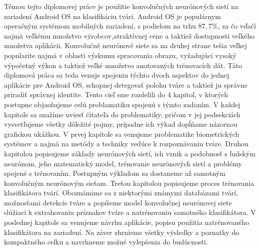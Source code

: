 \indent Témou tejto diplomovej práce je použitie konvolučných neurónových sietí na zariadení Android OS na klasifikáciu tvárí.
Android OS je populárnym operačným systémom mobilných zariadení, s podielom na trhu $ 87,7\% $, za čo vďačí najmä veľkému množstvo výrobcov,atraktívnej cene a taktiež dostupnosti veľkého množstva aplikácii.
Konvolučné neurónové siete sa na druhej strane tešia veľkej popularite najmä v oblasti výskumu spracovania obrazu, vyžadujúci vysoký výpočetný výkon a taktiež veľké množstvo anotovaných trénovacích dát.
Táto diplomová práca sa teda venuje spojeniu týchto dvoch aspektov do jednej aplikácie pre Android OS, schopnej detegovať polohu tváre a taktiež ju správne priradiť správnej identite.
Tento cieľ sme rozdelili do 4 kapitol, v ktorých postupne objasňujeme celú problamatiku spojenú s týmto zadaním.
V každej kapitole sa snažíme uviesť čitateľa do problematiky, pričom v jej podsekciách vysvetľujeme všetky dôležité pojmy, prípadne ich výkad dopĺňame názornou grafickou ukážkou.
V prvej kapitole sa venujeme problematike biometrických systémov a najmä na metódy a techniky vedúce k rozpoznávaniu tváre.
Druhou kapitolou popisujeme základy neurónových sietí, ich vznik a podobnosť s ľudským neurónom, jeho matematický model, trénovanie neurónových sietí a problémy spojené s trénovaním.
Postupným výkladom sa dostaneme až samotným konvolučným neurónovým sieťam.
Treťou kapitolou popisujeme proces trénovania klasifikátora tvárí.
Oboznámime sa z niektorými známymi databázami tvárí, možnosťami detekcie tváre a popíšeme model konvolučnej neurónovej siete slúžiaci k extrahovaniu príznakov tváre a natrénovaniu samotného klasifikátora.
V poslednej kapitole sa venujeme návrhu aplikácie, popisu použitia natrénovaného klasifikátora na zariadení.
Na záver zhrnieme všetky výsledky a poznatky do kompaktného celku a navrhneme možné vylepšenia do budúcnosti.



